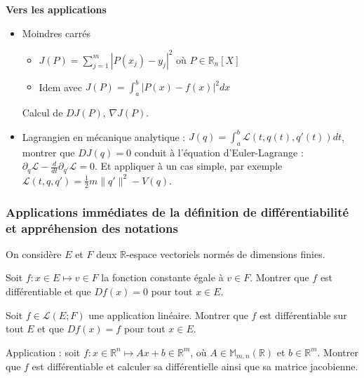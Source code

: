 \documentclass[11pt,a4paper]{article}
\begin{document}
{\noindent 
\textbf{Vers les applications} 
\begin{itemize}
    \item Moindres carrés  
        \begin{itemize} 
            \item $J(P) = \sum_{j=1}^m | P(x_j) - y_j |^2$ où $P \in \mathbb R_n[X]$
            \item Idem avec $J(P) = \displaystyle \int_a^b | P(x) - f(x) |^2 dx$
        \end{itemize}
        Calcul de $DJ(P)$, $\nabla J(P)$.
    \item Lagrangien en mécanique analytique : $J(q) = \int_a^b \mathcal L(t, q(t), q'(t)) dt$, montrer que $DJ(q) = 0$ conduit à l'équation d'Euler-Lagrange : $\partial_q \mathcal L - \frac{d}{dt} \partial_{q'} \mathcal L = 0$. Et appliquer à un cas simple, par exemple $\mathcal L(t, q, q') = \frac{1}{2} m \| q' \|^2 - V(q)$. 
\end{itemize}
}


\subsubsection{Applications immédiates de la définition de différentiabilité et appréhension des notations}

\begin{exercice} 
    On considère $E$ et $F$ deux $\mathbb R$-espace vectoriels normés de dimensions finies. 
    \begin{questions}
        \item Soit $f : x \in E \mapsto v \in F$ la fonction constante égale à $v \in F$. Montrer que $f$ est différentiable et que $Df(x) = 0$ pour tout $x \in E$.
        \item Soit $f \in \mathcal L(E ; F)$ une application linéaire. Montrer que $f$ est différentiable sur tout $E$ et que $Df(x) = f$ pour tout $x \in E$. 
        \item Application : soit $f : x \in \mathbb R^n \mapsto A x + b \in \mathbb R^m$, où $A \in \mathbb M_{m, n}(\mathbb R)$ et $b \in \mathbb R^m$. Montrer que $f$ est différentiable et calculer sa différentielle ainsi que sa matrice jacobienne.
    \end{questions}
\end{exercice}
\end{document}

